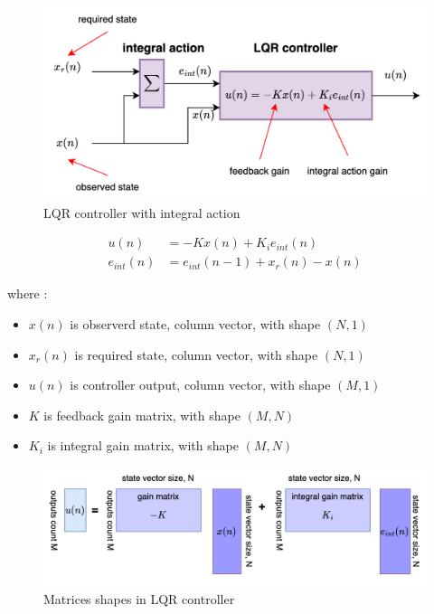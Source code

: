 \documentclass[12pt,twoside,onecolumn,openany,extrafontsizes,dvipsnames]{memoir}
\begin{document}
        \begin{figure}[!htb]
            \centering
            \includegraphics[scale=0.8]{../diagrams/control_generic/control_generic-lqr_discrete.png}
            \caption{LQR controller with integral action}
            \label{fig:control_lqr_generic}
        \end{figure}

        \begin{align}
            u(n)&= -Kx(n) + K_ie_{int}(n) \label{eq:lqr_integral_action} \\
            e_{int}(n)& = e_{int}(n-1) + x_r(n) - x(n)
        \end{align}

        where : 
        \begin{itemize}
            \item $x(n)$ is observerd state, column vector, with shape $(N, 1)$
            \item $x_r(n)$ is required state, column vector, with shape $(N, 1)$
            \item $u(n)$ is controller output, column vector, with shape $(M, 1)$
            \item $K$ is feedback gain matrix, with shape $(M, N)$
            \item $K_i$ is integral gain matrix, with shape $(M, N)$ 
        \end{itemize}


        \begin{figure}[!htb]
            \centering
            \includegraphics[scale=0.8]{../diagrams/control_generic/control_generic-lqr_detail.png}
            \caption{Matrices shapes in LQR controller}
            \label{fig:control_lqr_matrices_shape}
        \end{figure}
        
\end{document}
